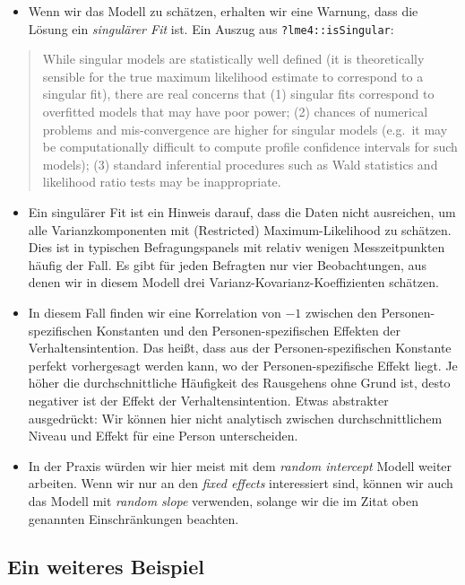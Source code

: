 \documentclass[
]{book}
\providecommand{\tightlist}{%
  \setlength{\itemsep}{0pt}\setlength{\parskip}{0pt}}
\begin{document}
\begin{itemize}
\tightlist
\item
  Wenn wir das Modell zu schätzen, erhalten wir eine Warnung, dass die Lösung ein \emph{singulärer Fit} ist. Ein Auszug aus \texttt{?lme4::isSingular}:
\end{itemize}

\begin{quote}
While singular models are statistically well defined (it is theoretically sensible for the true maximum likelihood estimate to correspond to a singular fit), there are real concerns that (1) singular fits correspond to overfitted models that may have poor power; (2) chances of numerical problems and mis-convergence are higher for singular models (e.g.~it may be computationally difficult to compute profile confidence intervals for such models); (3) standard inferential procedures such as Wald statistics and likelihood ratio tests may be inappropriate.
\end{quote}

\begin{itemize}
\tightlist
\item
  Ein singulärer Fit ist ein Hinweis darauf, dass die Daten nicht ausreichen, um alle Varianzkomponenten mit (Restricted) Maximum-Likelihood zu schätzen. Dies ist in typischen Befragungspanels mit relativ wenigen Messzeitpunkten häufig der Fall. Es gibt für jeden Befragten nur vier Beobachtungen, aus denen wir in diesem Modell drei Varianz-Kovarianz-Koeffizienten schätzen.
\item
  In diesem Fall finden wir eine Korrelation von \(-1\) zwischen den Personen-spezifischen Konstanten und den Personen-spezifischen Effekten der Verhaltensintention. Das heißt, dass aus der Personen-spezifischen Konstante perfekt vorhergesagt werden kann, wo der Personen-spezifische Effekt liegt. Je höher die durchschnittliche Häufigkeit des Rausgehens ohne Grund ist, desto negativer ist der Effekt der Verhaltensintention. Etwas abstrakter ausgedrückt: Wir können hier nicht analytisch zwischen durchschnittlichem Niveau und Effekt für eine Person unterscheiden.
\item
  In der Praxis würden wir hier meist mit dem \emph{random intercept} Modell weiter arbeiten. Wenn wir nur an den \emph{fixed effects} interessiert sind, können wir auch das Modell mit \emph{random slope} verwenden, solange wir die im Zitat oben genannten Einschränkungen beachten.
\end{itemize}

\hypertarget{ein-weiteres-beispiel}{%
\subsection*{Ein weiteres Beispiel}\label{ein-weiteres-beispiel}}
\end{document}
